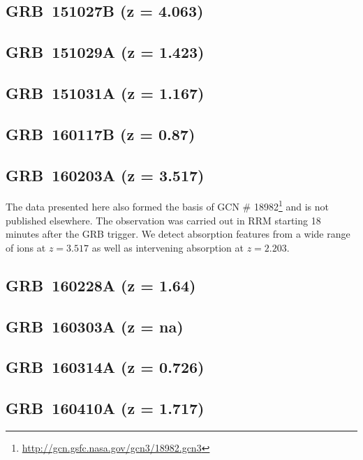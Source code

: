 \documentclass{aa}    %
\begin{document}
\subsection{GRB~151027B (z = 4.063)}	



\subsection{GRB~151029A (z = 1.423)}	



\subsection{GRB~151031A (z = 1.167)}	



\subsection{GRB~160117B (z = 0.87)}	



\subsection{GRB~160203A (z = 3.517)}
The data presented here also formed the basis of GCN \#
18982\footnote{\url{http://gcn.gsfc.nasa.gov/gcn3/18982.gcn3}} and is not
published elsewhere. The observation was carried out in RRM starting 18 minutes
after the GRB trigger. We detect absorption features from a wide range of ions
at $z=3.517$ as well as intervening absorption at $z=2.203$.

\subsection{GRB~160228A (z = 1.64)}	



\subsection{GRB~160303A (z = na)}	



\subsection{GRB~160314A (z = 0.726)}	



\subsection{GRB~160410A (z = 1.717)}	
\end{document}
